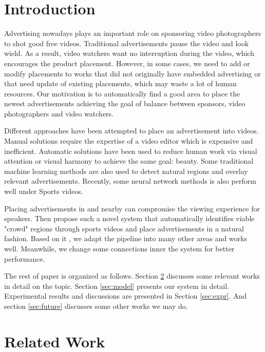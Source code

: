 \documentclass{sig-alternate}
\begin{document}

\section{Introduction}
\label{sec:intro}
Advertising nowadays plays an important role on sponsoring video photographers to shot good free videos. 
Traditional advertisements pause the video and look wield. 
As a result, video watchers want no interruption during the video, which encourages the product placement. 
However, in some cases, we need to add or modify placements to works that did not originally have embedded advertising or that need update of existing placements, which may waste a lot of human resources. 
Our motivation is to automatically find a good area to place the newest advertisements achieving the goal of balance between sponsors, video photographers and video watchers.

Different approaches have been attempted to place an advertisement into videos.
Manual solutions require the expertise of a video editor which is expensive and inefficient.
Automatic solutions have been used to reduce human work via visual attention \cite{} or visual harmony \cite{} to achieve the same goal: beauty.
Some traditional machine learning methods \cite{5,25} are also used to detect natural regions and overlay relevant advertisements.
Recently, some neural network methods \cite{} is also perform well under Sports videos.

Placing advertisements in and nearby can compromise the viewing experience for speakers. Then \cite{} propose such a novel system that automatically identifies viable "crowd" regions through sports videos and place advertisements in a natural fashion. 
Based on it \cite{}, we adapt the pipeline into many other areas and works well. Meanwhile, we change some connections inner the system for better performance.

The rest of paper is organized as follows. Section \ref{sec:rel-work} discusses some relevant works in detail on the topic. Section \ref{sec:model} presents our system in detail. Experimental results and discussions are presented in Section \ref{sec:expr}. And section \ref{sec:future} discusses some other works we may do.

\section{Related Work}
\label{sec:rel-work}
\end{document}
